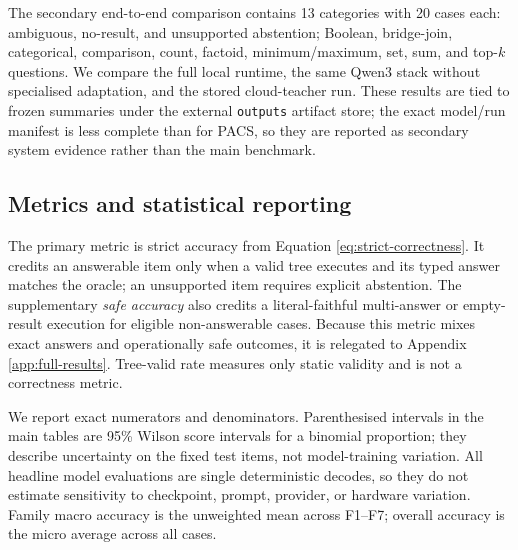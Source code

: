 The secondary end-to-end comparison contains 13 categories with 20 cases each: ambiguous,
no-result, and unsupported abstention; Boolean, bridge-join, categorical, comparison, count,
factoid, minimum/maximum, set, sum, and top-$k$ questions.  We compare the full local runtime,
the same Qwen3 stack without specialised adaptation, and the stored cloud-teacher run.  These
results are tied to frozen summaries under the external \texttt{outputs} artifact store; the
exact model/run manifest is less complete than for PACS, so they are reported as secondary
system evidence rather than the main benchmark.

\subsection{Metrics and statistical reporting}

The primary metric is strict accuracy from Equation \ref{eq:strict-correctness}.  It credits an
answerable item only when a valid tree executes and its typed answer matches the oracle; an
unsupported item requires explicit abstention.  The supplementary \emph{safe accuracy} also
credits a literal-faithful multi-answer or empty-result execution for eligible non-answerable
cases.  Because this metric mixes exact answers and operationally safe outcomes, it is relegated
to Appendix \ref{app:full-results}.  Tree-valid rate measures only static validity and is not a
correctness metric.

We report exact numerators and denominators.  Parenthesised intervals in the main tables are 95\%
Wilson score intervals for a binomial proportion; they describe uncertainty on the fixed test
items, not model-training variation.  All headline model evaluations are single deterministic
decodes, so they do not estimate sensitivity to checkpoint, prompt, provider, or hardware
variation.  Family macro accuracy is the unweighted mean across F1--F7; overall accuracy is the
micro average across all \PacsN{} cases.
